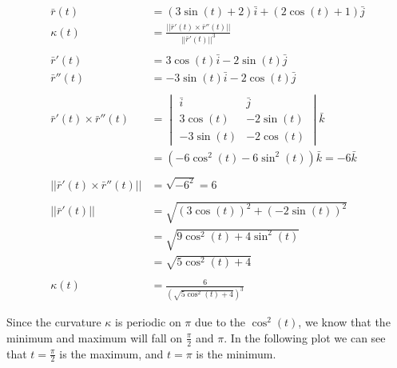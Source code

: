 \documentclass[a4paper,11pt]{article}
\begin{document}
\begin{enumerate}
\begin{enumerate}
        \begin{align*}
            \bar{r}(t) &= (3\sin(t) +2)\bar{i} + (2\cos(t)+1)\bar{j}\\
            \kappa(t) &= \frac{|| \bar{r}'(t) \times \bar{r}''(t) ||}{|| \bar{r}'(t) ||^3}\\\\
            \bar{r}'(t) &= 3\cos(t)\bar{i} -2\sin(t)\bar{j}\\
            \bar{r}''(t) &= -3\sin(t)\bar{i} -2\cos(t)\bar{j}\\\\
            \bar{r}'(t) \times \bar{r}''(t) &= 
            \begin{vmatrix}
                \bar{i} & \bar{j} \\
                3\cos(t) & -2\sin(t) \\
                -3\sin(t) & -2\cos(t) 
            \end{vmatrix}\bar{k}\\
            &= \left( -6\cos^2(t) - 6\sin^2(t) \right)\bar{k} = -6\bar{k}\\\\
            || \bar{r}'(t) \times \bar{r}''(t) || &= \sqrt{-6^2} = 6\\\\
            || \bar{r}'(t) || &= \sqrt{(3\cos(t))^2 + (-2\sin(t))^2}\\
            &= \sqrt{9\cos^2(t) + 4\sin^2(t)}\\
            &= \sqrt{5\cos^2(t) + 4} \\\\
            \kappa(t) &= \frac{6}{\left(\sqrt{5\cos^2(t) + 4}\right)^3}
        \end{align*}

        Since the curvature $\kappa$ is periodic on $\pi$ due to the $\cos^2(t)$, we know that the minimum and maximum will fall on $\frac{\pi}{2}$ and $\pi$. In the following plot we can see that $t=\frac{\pi}{2}$ is the maximum, and $t=\pi$ is the minimum.

        \begin{center}
        \end{center}


\end{enumerate}
\end{enumerate}
\end{document}
